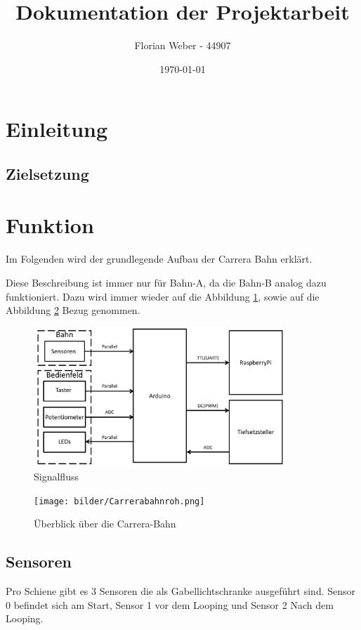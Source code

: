 \documentclass[a4paper, 11pt]{scrartcl}
\title{Dokumentation der Projektarbeit}
\author{Florian Weber - 44907}
\date{\today}
\begin{document}
\maketitle	%
\newpage

\tableofcontents 	%
\listoffigures		%
\newpage

\section{Einleitung}
\subsection{Zielsetzung}
\newpage

\section{Funktion}
	Im Folgenden wird der grundlegende Aufbau der Carrera Bahn erklärt.

	Diese Beschreibung ist immer nur für Bahn-A, da die
	Bahn-B analog dazu funktioniert. Dazu wird immer wieder auf die Abbildung \ref{img:signalfluss}, sowie auf die \\Abbildung
	\ref{img:carrerakomplett} Bezug genommen.
	\begin{figure}[h]
		\centering
		\includegraphics[width=0.85\textwidth]{rec/signalfluss.pdf}
		\caption{Signalfluss}
		\label{img:signalfluss}
	\end{figure}
	\begin{figure}[h]
	\centering
	\texttt{[image: bilder/Carrerabahnroh.png]}
	\caption{Überblick über die Carrera-Bahn}
	\label{img:carrerakomplett}
	\end{figure}
	\newpage

	\subsection{Sensoren}
		Pro Schiene gibt es 3 Sensoren die als Gabellichtschranke ausgeführt sind. Sensor 0 befindet sich am Start, Sensor 1 vor dem Looping und 		Sensor 2 Nach dem Looping.\\
\end{document}
